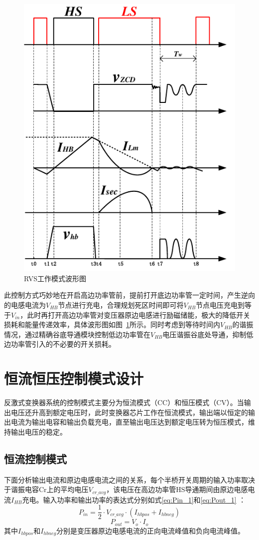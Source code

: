 \begin{figure}[htbp] 
    \centering
    \includegraphics[width=0.6\linewidth]{figures/RVS波形图.pdf}
    \caption{RVS工作模式波形图}
    \label{fig:RVS波形图}
\end{figure}

此控制方式巧妙地在开启高边功率管前，提前打开底边功率管一定时间，产生逆向的电感电流为$V_{HB}$节点进行充电，合理规划死区时间即可将$V_{HB}$节点电压充电到等于$V_{in}$，此时再打开高边功率管对变压器原边电感进行励磁储能，极大的降低开关损耗和能量传递效率，具体波形图如图~\ref{fig:RVS波形图}所示。同时考虑到等待时间内$V_{HB}$的谐振情况，通过精确谷底导通模块控制低边功率管在$V_{HB}$电压谐振谷底处导通，抑制低边功率管引入的不必要的开关损耗。

\section{恒流恒压控制模式设计}
反激式变换器系统的控制模式主要分为恒流模式（CC）和恒压模式（CV）。当输出电压还升高到额定电压时，此时变换器芯片工作在恒流模式，输出端以恒定的输出电流为输出电容和输出负载充电，直至输出电压达到额定电压转为恒压模式，维持输出电压的稳定。
\subsection{恒流控制模式}

下面分析输出电流和原边电感电流之间的关系，每个半桥开关周期的输入功率取决于谐振电容Cr上的平均电压$V_{cr\_avg}$，该电压在高边功率管HS导通期间由原边电感电流$I_{HB}$充电。输入功率和输出功率的表达式分别如式\eqref{eq:Pin_1}和\eqref{eq:Pout_1} ：
\begin{equation}
    \label{eq:Pin_1}
    P_{in}=\frac{1}{2} \cdot V_{cr\_avg} \cdot (I_{hbpos}+I_{hbneg})
\end{equation}
\begin{equation}
    \label{eq:Pout_1}
    P_{out}=V_o \cdot I_o
\end{equation}
其中$I_{hbpos}$和$I_{hbneg}$分别是变压器原边电感电流的正向电流峰值和负向电流峰值。

